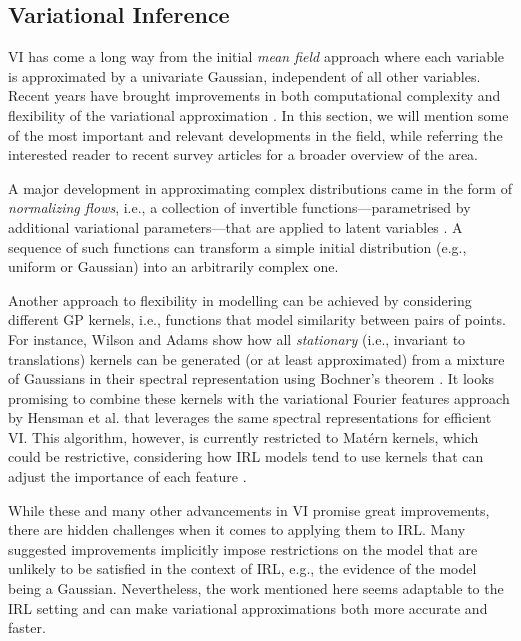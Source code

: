 \documentclass{mpaper}
\begin{document}
\subsection{Variational Inference}

VI has come a long way from the initial \emph{mean field} approach where each
variable is approximated by a univariate Gaussian, independent of all other
variables. Recent years have brought improvements in both computational
complexity and flexibility of the variational approximation
\cite{blei2017variational}. In this section, we will mention some of the most
important and relevant developments in the field, while referring the interested
reader to recent survey articles
\cite{blei2017variational,DBLP:journals/corr/abs-1711-05597} for a broader
overview of the area.

A major development in approximating complex distributions came in the form of
\emph{normalizing flows}, i.e., a collection of invertible
functions---parametrised by additional variational parameters---that are applied
to latent variables \cite{DBLP:conf/icml/RezendeM15}. A sequence of such
functions can transform a simple initial distribution (e.g., uniform or
Gaussian) into an arbitrarily complex one.

Another approach to flexibility in modelling can be achieved by considering
different GP kernels, i.e., functions that model similarity between pairs of
points. For instance, Wilson and Adams \cite{pmlr-v28-wilson13} show how all
\emph{stationary} (i.e., invariant to translations) kernels can be generated (or
at least approximated) from a mixture of Gaussians in their spectral
representation using Bochner's theorem \cite{bochner1959lectures}. It looks
promising to combine these kernels with the variational Fourier features
approach by Hensman et al. \cite{DBLP:journals/jmlr/HensmanDS17} that leverages
the same spectral representations for efficient VI. This algorithm, however, is
currently restricted to Mat\'ern kernels, which could be restrictive,
considering how IRL models tend to use kernels that can adjust the importance of
each feature \cite{DBLP:conf/uai/JinDAS17,DBLP:conf/nips/LevinePK11}.

While these and many other advancements in VI promise great improvements, there
are hidden challenges when it comes to applying them to IRL. Many suggested
improvements implicitly impose restrictions on the model that are unlikely to be
satisfied in the context of IRL, e.g., the evidence of the model being a
Gaussian. Nevertheless, the work mentioned here seems adaptable to the IRL
setting and can make variational approximations both more accurate and faster.
\end{document}
